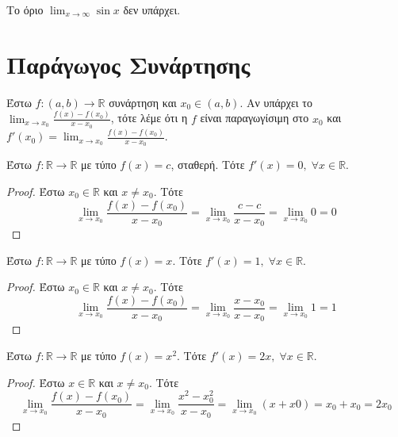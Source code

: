 \documentclass[main.tex]{subfiles}
\begin{document}
\begin{prop}
    Το όριο $ \lim_{x \to \infty} \sin{x} $ δεν υπάρχει.
\end{prop}

\section{Παράγωγος Συνάρτησης}

\begin{dfn}
    Έστω $ f \colon (a,b) \to \mathbb{R} $ συνάρτηση και $ x_{0} \in (a,b) $. Αν 
    υπάρχει το $ \lim_{x \to x_{0}} \frac{f(x) - f(x_{0})}{x - x_{0}}$, τότε λέμε ότι 
    η $f$ είναι παραγωγίσιμη στο $ x_{0} $ και $ f'(x_{0}) = \lim_{x \to x_{0}} 
    \frac{f(x)-f(x_{0})}{x- x_{0}} $.
\end{dfn}

\begin{prop}
    Έστω $ f \colon \mathbb{R} \to \mathbb{R} $ με τύπο $ f(x)=c $, σταθερή. Τότε 
    $ f'(x) = 0, \; \forall x \in \mathbb{R} $. 
\end{prop}

\begin{proof}
    Έστω $ x_{0} \in \mathbb{R} $ και $ x \neq x_{0} $. Τότε
    \[
        \lim_{x \to x_{0}}  \frac{f(x) - f(x_{0})}{x - x_{0}} = \lim_{x \to x_{0}} 
        \frac{c - c}{x - x_{0}} = \lim_{x \to x_{0}} 0 = 0
     \] 

\end{proof}

\begin{prop}
    Έστω $ f \colon \mathbb{R} \to \mathbb{R} $ με τύπο $ f(x)=x $. Τότε 
    $ f'(x) = 1, \; \forall x \in \mathbb{R} $. 
\end{prop}

\begin{proof}
    Έστω $ x_{0} \in \mathbb{R} $ και $ x \neq x_{0} $. Τότε
   \[
       \lim_{x \to x_{0}} \frac{f(x) - f(x_{0})}{x - x_{0}} = \lim_{x \to x_{0}} 
       \frac{x - x_{0}}{x - x_{0}} = \lim_{x \to x_{0}} 1 = 1
    \] 

\end{proof}

\begin{prop}
    Έστω $ f \colon \mathbb{R} \to \mathbb{R} $ με τύπο $ f(x)=x^{2} $. Τότε 
    $ f'(x) = 2x, \; \forall x \in \mathbb{R} $. 
\end{prop}

\begin{proof}
    Έστω $ x \in \mathbb{R} $ και $ x \neq x_{0} $. Τότε 
    \[
        \lim_{x \to x_{0}} \frac{f(x) - f(x_{0})}{x- x_{0}} = \lim_{x \to x_{0}} 
        \frac{x^{2} - x_{0}^{2}}{x - x_{0}} = \lim_{x \to x_{0}} (x+x0) = x_{0}+ x_{0}
        = 2 x_{0}
     \] 
\end{proof}
\end{document}
